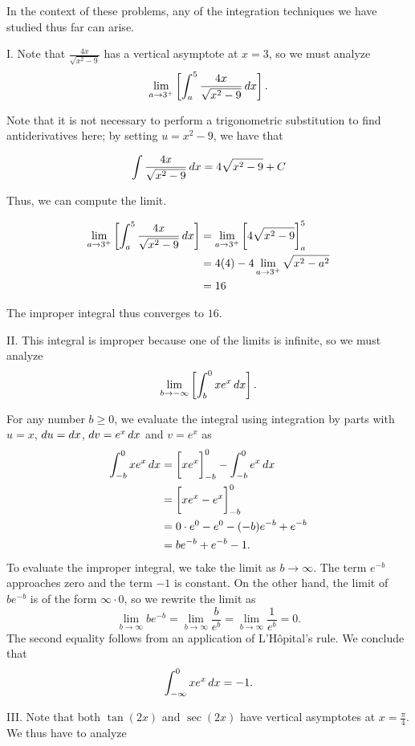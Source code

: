 \documentclass[handout]{ximera}
\begin{document}
\begin{freeResponse} In the context of these problems, any of the integration techniques we have studied thus far can arise.

I. Note that $\frac{4x}{\sqrt{x^2-9}}$ has a vertical asymptote at $x=3$, so we must analyze 
\[\lim_{a \to 3^+} \left[\int_a^5 \frac{4x}{\sqrt{x^2-9}} \mathop{}\!d x \right].\]

Note that it is not necessary to perform a trigonometric substitution to find antiderivatives here; by setting $u=x^2-9$, we have that

\[
\int \frac{4x}{\sqrt{x^2-9}} \mathop{}\!d x = 4 \sqrt{x^2-9}+C
\]

Thus, we can compute the limit.

\begin{align*}
\lim_{a \to 3^+} \left[\int_a^5 \frac{4x}{\sqrt{x^2-9}} \mathop{}\!d x \right] &= \lim_{a \to 3^+} \bigg[ 4 \sqrt{x^2-9} \bigg]_a^5\\
&= 4(4) - 4 \lim_{a \to 3^+} \sqrt{x^2-a^2} \\
&= 16
\end{align*}

The improper integral thus converges to $16$.

II. This integral is improper because one of the limits is infinite, so we must analyze 
\[\lim_{b \to -\infty} \left[\int_b^0 x e^x \mathop{}\!d x \right].\]

For any number $b \geq 0$, we evaluate the integral using integration by parts with $u=x$, $\mathop{}\!d u = \mathop{}\!d x$, $\mathop{}\!d v = e^x \mathop{}\!d x$ and $v = e^x$ as
\begin{align*}
\int_{-b}^0 x e^x \mathop{}\!d x &= \bigg[ x e^x \bigg]_{-b}^0 - \int_{-b}^0 e^x \mathop{}\!d x \\
&= \bigg[ x e^x - e^x \bigg]_{-b}^0 \\
&= 0 \cdot e^0 - e^0 - (-b)e^{-b} + e^{-b} \\
&= b e^{-b} + e^{-b} - 1.
\end{align*}
To evaluate the improper integral, we take the limit as $b \rightarrow \infty$. The term $e^{-b}$ approaches zero and the term $-1$ is constant. On the other hand, the limit of $b e^{-b}$ is of the form $\infty \cdot 0$, so we rewrite the limit as
$$
\lim_{b\rightarrow \infty}b e^{-b} = \lim_{b\rightarrow \infty} \frac{b}{e^b} = \lim_{b\rightarrow \infty} \frac{1}{e^b} = 0.
$$
The second equality follows from an application of L'H\^{o}pital's rule. We conclude that 
$$
\int_{-\infty}^0 x e^x \mathop{}\!d x = -1.
$$

III. Note that both $\tan(2x)$ and $\sec(2x)$ have vertical asymptotes at $x=\frac{\pi}{4}$.  We thus have to analyze


\end{freeResponse}
\end{document}
